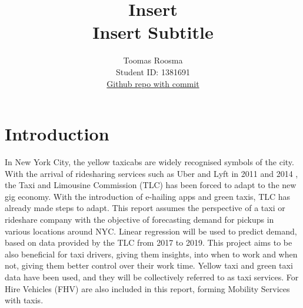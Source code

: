 \documentclass[11pt]{article}
\title{\textbf{Insert} \\ Insert Subtitle}
\author{
Toomas Roosma \\
Student ID: 1381691 \\
\href{https://github.com/MAST30034-Applied-Data-Science/mast30034-project-1-ToomasRo/commit/68eb95dd343f163fd64bdcbf79bc71494db85056}{Github repo with commit}
}
\begin{document}
\maketitle

\section{Introduction}
In  New York City, the yellow taxicabs are widely recognised symbols of the city. 
With the arrival of ridesharing services such as Uber and Lyft in 2011 \cite{uberStartDate} and 2014 \cite{lyftStartDate}, the Taxi and Limousine Commission (TLC) has been forced to adapt to the new 
gig economy. With the introduction of e-hailing apps and green taxis, TLC has already made steps to adapt. This report
assumes the perspective of a taxi or rideshare company with the objective of forecasting demand for pickups in various locations around NYC.
Linear regression will be used to predict demand, based on data provided by the TLC from 2017 to 2019. This project aims to be also beneficial for taxi drivers, giving them insights, into when to work and when not, giving them better control over their work time. Yellow taxi and green taxi data have been used, and they will be collectively referred to as taxi services. For Hire Vehicles (FHV) are also included in this report, forming Mobility Services with taxis.

\end{document}

